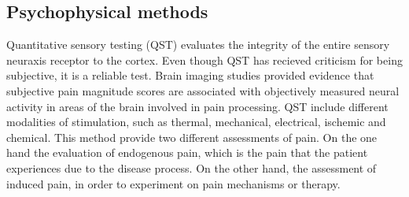 \subsection{Psychophysical methods}
Quantitative sensory testing (QST) evaluates the integrity of the entire sensory neuraxis receptor to the cortex. Even though QST has recieved criticism for being subjective, it is a reliable test. Brain imaging studies provided evidence that subjective pain magnitude scores are associated with objectively measured neural activity in areas of the brain involved in pain processing. QST include different modalities of stimulation, such as thermal, mechanical, electrical, ischemic and chemical. This method provide two different assessments of pain. On the one hand the  evaluation of endogenous pain, which is the pain that the patient experiences due to the disease process. On the other hand, the assessment of induced pain, in order to experiment on pain mechanisms or therapy. \cite{neurop_exam}


